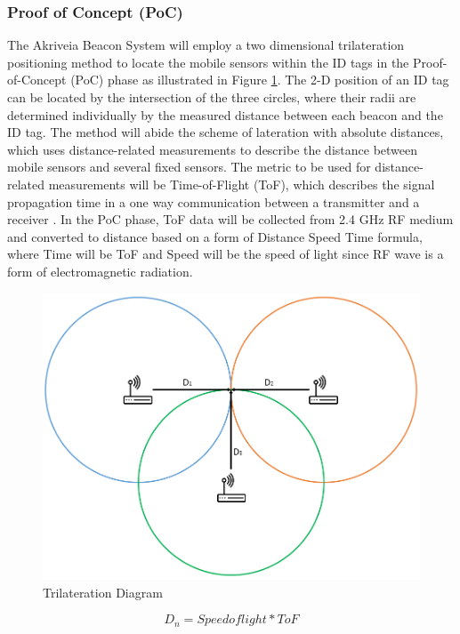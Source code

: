 \subsubsection{Proof of Concept (PoC)}
The Akriveia Beacon System will employ a two dimensional trilateration positioning method to locate the mobile sensors within the ID tags in the Proof-of-Concept (PoC) phase as illustrated in Figure \ref{Tri}. The 2-D position of an ID tag can be located by the intersection of the three circles, where their radii  are determined individually by the measured distance between each beacon and the ID tag. The method will abide the scheme of lateration with absolute distances, which uses distance-related measurements to describe the distance between mobile sensors and several fixed sensors. The metric to be used for distance-related measurements will be Time-of-Flight (ToF), which describes the signal propagation time in a one way communication between a transmitter and a receiver \cite{R6}. In the PoC phase, ToF data will be collected from 2.4 GHz RF medium and converted to distance based on a form of Distance Speed Time formula, where Time will be ToF and Speed will be the speed of light since RF wave is a form of electromagnetic radiation.
\medskip
\begin{figure}[h!]
    \centering
    \includegraphics[width=\linewidth]{./images/Tri.png}
    \caption{Trilateration Diagram}
    \label{Tri}
\end{figure}

\begin{equation}
D_n = Speed of light * ToF
\end{equation}

